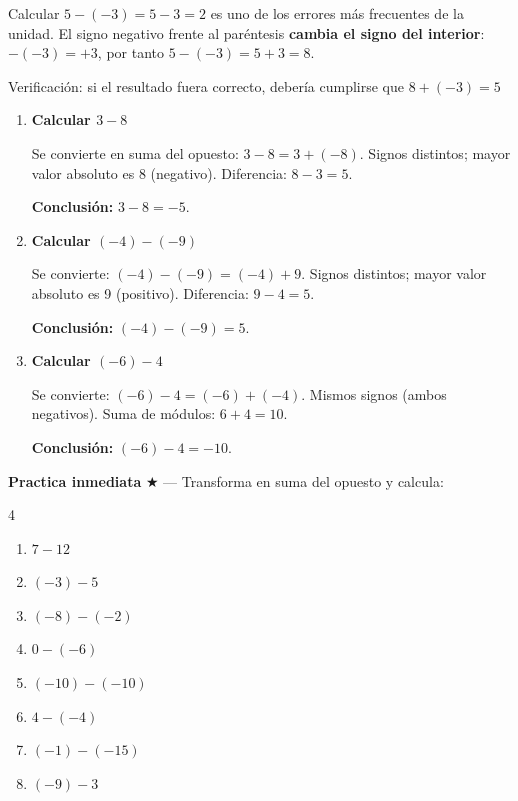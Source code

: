 \documentclass[11pt, letterpaper]{article}
\begin{document}
\begin{tcolorbox}[warningbox, title={Error frecuente --- restar un negativo}]
Calcular $5-(-3)=5-3=2$ es uno de los errores m\'as frecuentes de la unidad. El signo negativo frente al par\'entesis \textbf{cambia el signo del interior}: $-(-3)=+3$, por tanto $5-(-3)=5+3=8$.

Verificaci\'on: si el resultado fuera correcto, deber\'ia cumplirse que $8+(-3)=5$ \checkmark
\end{tcolorbox}

\begin{tcolorbox}[examplebox, title={Ejemplos --- sustracci\'on de enteros}]
\begin{enumerate}[label=\textbf{Ej. \arabic*.}, leftmargin=*, itemsep=12pt]

\item \textbf{Calcular $3-8$}

Se convierte en suma del opuesto: $3-8=3+(-8)$. Signos distintos; mayor valor absoluto es 8 (negativo). Diferencia: $8-3=5$.

\medskip
\textbf{Conclusi\'on:} $3-8=-5$.

\item \textbf{Calcular $(-4)-(-9)$}

Se convierte: $(-4)-(-9)=(-4)+9$. Signos distintos; mayor valor absoluto es 9 (positivo). Diferencia: $9-4=5$.

\medskip
\textbf{Conclusi\'on:} $(-4)-(-9)=5$.

\item \textbf{Calcular $(-6)-4$}

Se convierte: $(-6)-4=(-6)+(-4)$. Mismos signos (ambos negativos). Suma de m\'odulos: $6+4=10$.

\medskip
\textbf{Conclusi\'on:} $(-6)-4=-10$.

\end{enumerate}
\end{tcolorbox}

\medskip
\textbf{Practica inmediata} \quad $\bigstar$ --- Transforma en suma del opuesto y calcula:
\begin{multicols}{4}
\begin{enumerate}[label=\alph*), leftmargin=*]
  \item $7-12$
  \item $(-3)-5$
  \item $(-8)-(-2)$
  \item $0-(-6)$
  \item $(-10)-(-10)$
  \item $4-(-4)$
  \item $(-1)-(-15)$
  \item $(-9)-3$
\end{enumerate}
\end{multicols}
\end{document}
